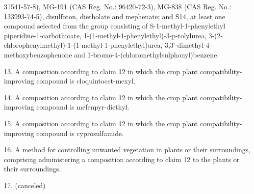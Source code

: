 \documentclass[11pt,a4paper]{article}
\begin{document}
31541-57-8), MG-191 (CAS Reg. No.: 96420-72-3), MG-838 (CAS Reg. No.: 133993-74-5), disulfoton, dietholate and mephenate; and S14, at least one compound selected from the group consisting of S-1-methyl-1-phenylethyl piperidine-1-carbothioate, 1-(1-methyl-1-phenylethyl)-3-p-tolylurea, 3-(2-chlorophenylmethyl)-1-(1-methyl-1-phenylethyl)urea, 3,3′-dimethyl-4-methoxybenzophenone and 1-bromo-4-(chloromethylsulphonyl)benzene.

13. A composition according to claim 12 in which the crop plant compatibility-improving compound is cloquintocet-mexyl.

14. A composition according to claim 12 in which the crop plant compatibility-improving compound is mefenpyr-diethyl.

15. A composition according to claim 12 in which the crop plant compatibility-improving compound is cyprosulfamide.

16. A method for controlling unwanted vegetation in plants or their surroundings, comprising administering a composition according to claim 12 to the plants or their surroundings.

17. (canceled)
\end{document}
